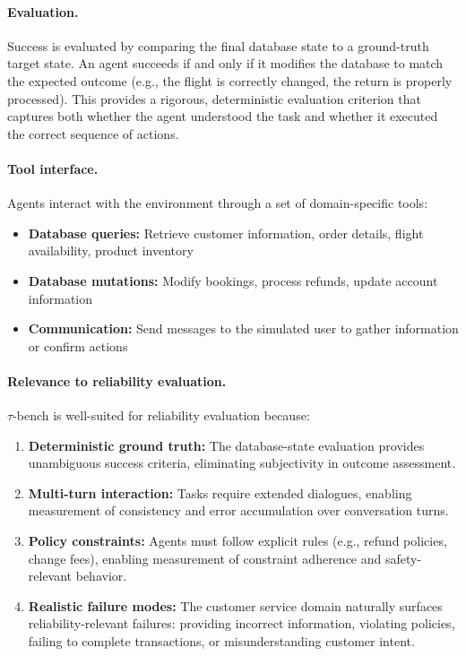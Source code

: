 \documentclass[11pt]{article}
\begin{document}
\paragraph{Evaluation.}
Success is evaluated by comparing the final database state to a ground-truth target state.
An agent succeeds if and only if it modifies the database to match the expected outcome (e.g., the flight is correctly changed, the return is properly processed).
This provides a rigorous, deterministic evaluation criterion that captures both whether the agent understood the task and whether it executed the correct sequence of actions.

\paragraph{Tool interface.}
Agents interact with the environment through a set of domain-specific tools:
\begin{itemize}[leftmargin=*, topsep=2pt]
    \item \textbf{Database queries:} Retrieve customer information, order details, flight availability, product inventory
    \item \textbf{Database mutations:} Modify bookings, process refunds, update account information
    \item \textbf{Communication:} Send messages to the simulated user to gather information or confirm actions
\end{itemize}

\paragraph{Relevance to reliability evaluation.}
$\tau$-bench is well-suited for reliability evaluation because:
\begin{enumerate}[leftmargin=*, topsep=2pt]
    \item \textbf{Deterministic ground truth:} The database-state evaluation provides unambiguous success criteria, eliminating subjectivity in outcome assessment.
    \item \textbf{Multi-turn interaction:} Tasks require extended dialogues, enabling measurement of consistency and error accumulation over conversation turns.
    \item \textbf{Policy constraints:} Agents must follow explicit rules (e.g., refund policies, change fees), enabling measurement of constraint adherence and safety-relevant behavior.
    \item \textbf{Realistic failure modes:} The customer service domain naturally surfaces reliability-relevant failures: providing incorrect information, violating policies, failing to complete transactions, or misunderstanding customer intent.
\end{enumerate}
\end{document}
